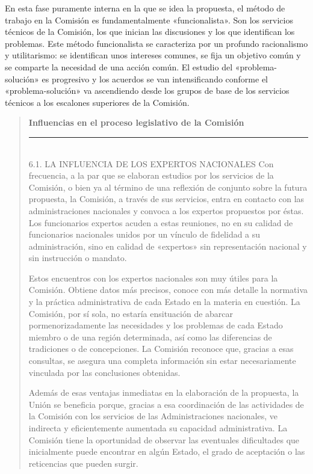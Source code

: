 \documentclass[10pt,a4paper]{article}
\newenvironment{specialblock}[1]{%
      \begin{quote} %
      \small %
      \noindent\textbf{#1}\\[-0.3em] %
      \rule{\linewidth}{0.4pt}\\[0.6em]}{
      \end{quote}}
\begin{document}
En esta fase puramente interna en la que se idea la propuesta, el método de trabajo en la Comisión es fundamentalmente «funcionalista». Son los servicios técnicos de la Comisión, los que inician las discusiones y los que identifican los problemas. Este método funcionalista se caracteriza por un profundo racionalismo y utilitarismo: se identifican unos intereses comunes, se fija un objetivo común y se comparte la necesidad de una acción común. El estudio del «problema-solución» es progresivo y los acuerdos se van intensificando conforme el «problema-solución» va ascendiendo desde los grupos de base de los servicios técnicos a los escalones superiores de la Comisión.

\begin{specialblock}{\textbf{Influencias en el proceso legislativo de la Comisión}}
    6.1. LA INFLUENCIA DE LOS EXPERTOS NACIONALES
Con frecuencia, a la par que se elaboran estudios por los servicios de la Comisión, o bien ya al término de una reflexión de conjunto sobre la futura propuesta, la Comisión, a través de sus servicios, entra en contacto con las administraciones nacionales y convoca a los expertos propuestos por éstas. Los funcionarios expertos acuden a estas reuniones, no en su calidad de funcionarios nacionales unidos por un vínculo de fidelidad a su administración, sino en calidad de «expertos» sin representación nacional y sin instrucción o mandato.

Estos encuentros con los expertos nacionales son muy útiles para la Comisión. Obtiene datos más precisos, conoce con más detalle la normativa y la práctica administrativa de cada Estado en la materia en cuestión. La Comisión, por sí sola, no estaría ensituación de abarcar pormenorizadamente las necesidades y los problemas de cada Estado miembro o de una región determinada, así como las diferencias de tradiciones o de concepciones. La Comisión reconoce que, gracias a esas consultas, se asegura una  completa información sin estar necesariamente vinculada por las conclusiones obtenidas.

Además de esas ventajas inmediatas en la elaboración de la propuesta, la Unión se beneficia porque, gracias a esa coordinación de las actividades de la Comisión con los servicios de las Administraciones nacionales, ve indirecta y eficientemente aumentada su capacidad administrativa. La Comisión tiene la oportunidad de observar las eventuales dificultades que inicialmente puede encontrar en algún Estado, el grado de aceptación o las reticencias que pueden surgir.


\end{specialblock}
\end{document}
